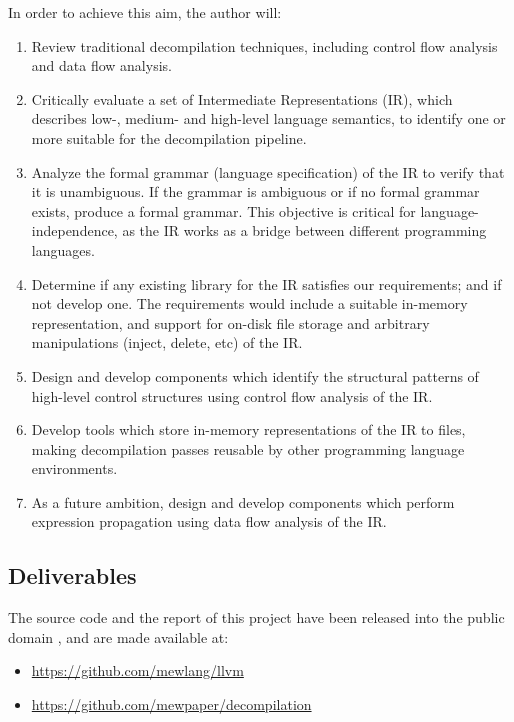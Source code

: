 \documentclass[12pt, a4paper]{article}
\begin{document}
In order to achieve this aim, the author will:

\begin{enumerate}
	\item Review traditional decompilation techniques, including control flow
analysis and data flow analysis.
	\item Critically evaluate a set of Intermediate Representations (IR), which
describes low-, medium- and high-level language semantics, to identify one or
more suitable for the decompilation pipeline.
	\item Analyze the formal grammar (language specification) of the IR to verify
that it is unambiguous. If the grammar is ambiguous or if no formal grammar
exists, produce a formal grammar. This objective is critical for
language-independence, as the IR works as a bridge between different programming
languages.
	\item Determine if any existing library for the IR satisfies our
requirements; and if not develop one. The requirements would include a suitable
in-memory representation, and support for on-disk file storage and arbitrary
manipulations (inject, delete, etc) of the IR.
	\item Design and develop components which identify the structural patterns of
high-level control structures using control flow analysis of the IR.
	\item Develop tools which store in-memory representations of the IR to files,
making decompilation passes reusable by other programming language environments.
	\item As a future ambition, design and develop components which perform
expression propagation using data flow analysis of the IR.
\end{enumerate}


\subsection{Deliverables}

The source code and the report of this project have been released into the
public domain \cite{cc0}, and are made available at:
\begin{itemize}
	\item \url{https://github.com/mewlang/llvm}
	\item \url{https://github.com/mewpaper/decompilation}
\end{itemize}
\end{document}
